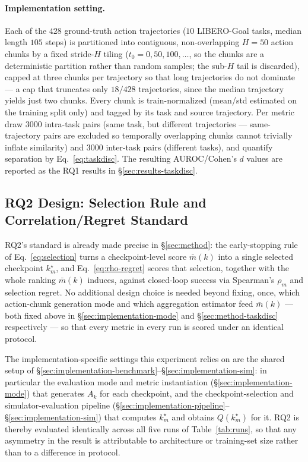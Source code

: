 \documentclass[english,12pt,a4paper,pdftex,elec,utf8]{aaltothesis}
\begin{document}
\paragraph{Implementation setting.} Each of the $428$ ground-truth action trajectories ($10$ LIBERO-Goal tasks, median length $105$ steps) is partitioned into contiguous, non-overlapping $H{=}50$ action chunks by a fixed stride-$H$ tiling ($t_0 = 0, 50, 100, \dots$, so the chunks are a deterministic partition rather than random samples; the sub-$H$ tail is discarded), capped at three chunks per trajectory so that long trajectories do not dominate --- a cap that truncates only $18/428$ trajectories, since the median trajectory yields just two chunks. Every chunk is train-normalized (mean/std estimated on the training split only) and tagged by its task and source trajectory. Per metric draw $3000$ intra-task pairs (same task, but different trajectories --- same-trajectory pairs are excluded so temporally overlapping chunks cannot trivially inflate similarity) and $3000$ inter-task pairs (different tasks), and quantify separation by Eq.~\ref{eq:taskdisc}. The resulting AUROC/Cohen's $d$ values are reported as the RQ1 results in \S\ref{sec:results-taskdisc}.

\subsection{RQ2 Design: Selection Rule and Correlation/Regret Standard}
\label{sec:design-rq2}

RQ2's standard is already made precise in \S\ref{sec:method}: the early-stopping rule of Eq.~\ref{eq:selection} turns a checkpoint-level score $\bar m(k)$ into a single selected checkpoint $k_m^\star$, and Eq.~\ref{eq:rho-regret} scores that selection, together with the whole ranking $\bar m(k)$ induces, against closed-loop success via Spearman's $\rho_m$ and selection regret. No additional design choice is needed beyond fixing, once, which action-chunk generation mode and which aggregation estimator feed $\bar m(k)$ --- both fixed above in \S\ref{sec:implementation-mode} and \S\ref{sec:method-taskdisc} respectively --- so that every metric in every run is scored under an identical protocol.

The implementation-specific settings this experiment relies on are the shared setup of \S\ref{sec:implementation-benchmark}--\S\ref{sec:implementation-sim}: in particular the evaluation mode and metric instantiation (\S\ref{sec:implementation-mode}) that generates $A_k$ for each checkpoint, and the checkpoint-selection and simulator-evaluation pipeline (\S\ref{sec:implementation-pipeline}--\S\ref{sec:implementation-sim}) that computes $k_m^\star$ and obtains $Q(k_m^\star)$ for it. RQ2 is thereby evaluated identically across all five runs of Table~\ref{tab:runs}, so that any asymmetry in the result is attributable to architecture or training-set size rather than to a difference in protocol.
\end{document}
